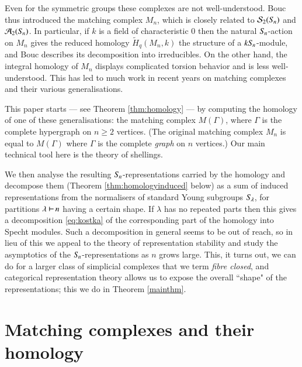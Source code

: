 \documentclass[matann2]{svjour1}
\def\symn{S_{\kern-1pt n}}
\def\Sp{\mathrm{Sp}}
\def\partition{\,\,\begin{tikzpicture}
\draw[line width=0.7pt](0,0)--(0,0.2);
\draw[line width=0.7pt](0,0.1)--(0.175,0.1);
\end{tikzpicture}\,}
\newcommand{\Sym}[1]{S_{\kern-1pt {#1}}}
\begin{document}
Even for the 
symmetric groups these complexes
are not well-understood. Bouc \cite{MR1174893} thus
introduced the matching complex $M_n$, which 
is closely related to 
$\mathcal{S}_2(\Sym{n})$ and $\mathcal{A}_2(\Sym{n})$.
In particular, if $k$ is a field of characteristic $0$ then the 
natural $\Sym{n}$-action
on $M_n$ gives the reduced homology
$\widetilde{H}_{q}(M_n,k)$ the structure of a $
k\Sym{n}$-module, and Bouc describes its decomposition
into irreducibles. 
On the other hand, the integral homology of $M_n$ displays 
complicated torsion behavior
and is less well-understood.
This has led to much work in recent years
on matching complexes and their various 
generalisations.

This paper starts --- see Theorem \ref{thm:homology} ---
by computing the homology of one of these 
generalisations: the matching complex
$M(\Gamma)$, where $\Gamma$ is the complete hypergraph on $n\geq 2$
vertices. (The original  matching complex $M_n$ is equal to $M(\Gamma)$
where $\Gamma$ is the complete \emph{graph\/} on $n$ vertices.)
Our main technical tool here is the theory of shellings.

We then analyse the resulting $\Sym{n}$-representations carried by the
homology and decompose them (Theorem \ref{thm:homologyinduced} below)
as a sum of induced representations from the normalisers of standard
Young subgroups $\Sym{\lambda}$, for partitions $\lambda\partition n$
having a certain shape. If $\lambda$ has no repeated parts then
this gives a decomposition \eqref{eq:kostka}
of the corresponding part of the homology into Specht modules.
Such a decomposition in general seems to be out of reach, so 
in lieu of this we appeal to the theory of representation stability
and study the asymptotics of the $\symn$-representations
as $n$ grows large. This, it turns out, we can do for a larger
class of simplicial complexes that we term \emph{fibre closed},
and categorical representation theory allows us to
expose the overall ``shape" of the representations; this we do in
Theorem \ref{mainthm}.




\section{Matching complexes and their homology}
\label{section:complexes}
\end{document}
